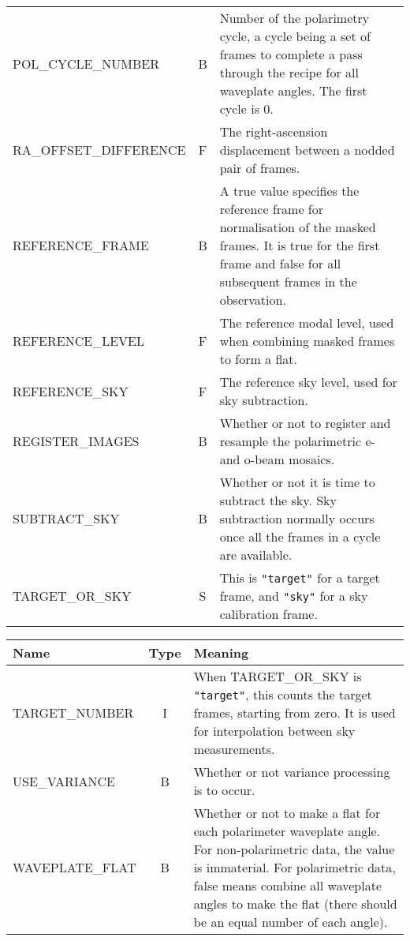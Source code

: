 \documentclass[twoside,11pt,nolof]{starlink}
\begin{document}
\begin{tabular}{lcp{93mm}}
POL\_CYCLE\_NUMBER  & B & Number of the polarimetry cycle, a cycle being a set of frames
                          to complete a pass through the recipe for all waveplate angles.
                          The first cycle is 0. \\
RA\_OFFSET\_DIFFERENCE & F & The right-ascension displacement between a nodded pair of
                          frames. \\
REFERENCE\_FRAME    & B & A true value specifies the reference frame for normalisation
                          of the masked frames.  It is true for the first frame
                          and false for all subsequent frames in the observation. \\
REFERENCE\_LEVEL    & F & The reference modal level, used when combining masked frames
                          to form a flat. \\
REFERENCE\_SKY      & F & The reference sky level, used for sky subtraction. \\
REGISTER\_IMAGES    & B & Whether or not to register and resample the polarimetric
                          e- and o-beam mosaics. \\
SUBTRACT\_SKY       & B & Whether or not it is time to subtract the sky.  Sky subtraction
                          normally occurs once all the frames in a cycle are available. \\
TARGET\_OR\_SKY     & S & This is \texttt{"target"} for a target frame, and \texttt{"sky"}
                          for a sky calibration frame. \\ \hline
\end{tabular}

\begin{tabular}{lcp{93mm}}
Name                & Type &  Meaning \\ \hline
TARGET\_NUMBER      & I & When TARGET\_OR\_SKY is \texttt{"target"}, this counts the target
                          frames, starting from zero.  It is used for interpolation
                          between sky measurements. \\
USE\_VARIANCE       & B & Whether or not variance processing is to occur. \\
WAVEPLATE\_FLAT     & B & Whether or not to make a flat for each polarimeter waveplate angle.
                          For non-polarimetric data, the value is immaterial.  For polarimetric
                          data, false means combine all waveplate angles to make the flat
                          (there should be an equal number of each angle). \\ \hline
\end{tabular}
\end{document}
